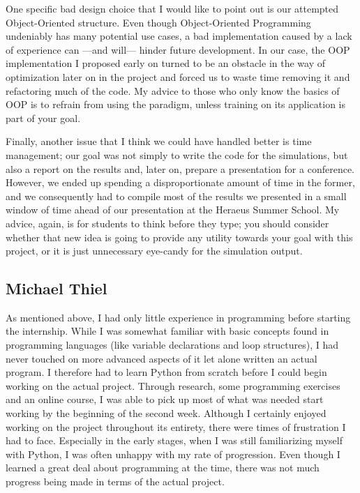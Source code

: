 \documentclass[11pt,twocolumn]{article}
\begin{document}
\begin{appendix}
\begin{strip}
One specific bad design choice that I would like to point out is our attempted Object-Oriented structure. Even though Object-Oriented Programming undeniably has many potential use cases, a bad implementation caused by a lack of experience can ---and will--- hinder future development. In our case, the OOP implementation I proposed early on turned to be an obstacle in the way of optimization later on in the project and forced us to waste time removing it and refactoring much of the code. My advice to those who only know the basics of OOP is to refrain from using the paradigm, unless training on its application is part of your goal.

Finally, another issue that I think we could have handled better is time management; our goal was not simply to write the code for the simulations, but also a report on the results and, later on, prepare a presentation for a conference. However, we ended up spending a disproportionate amount of time in the former, and we consequently had to compile most of the results we presented in a small window of time ahead of our presentation at the Heraeus Summer School. My advice, again, is for students to think before they type; you should consider whether that new idea is going to provide any utility towards your goal with this project, or it is just unnecessary eye-candy for the simulation output.

\subsection{Michael Thiel} \label{Thiel}

As mentioned above, I had only little experience in programming before starting the internship. While I was somewhat familiar with basic concepts found in programming languages (like variable declarations and loop structures), I had never touched on more advanced aspects of it let alone written an actual program. I therefore had to learn Python from scratch before I could begin working on the actual project. Through research, some programming exercises and an online course,{\footnotemark} I was able to pick up most of what was needed start working by the beginning of the second week. 
Although I certainly enjoyed working on the project throughout its entirety, there were times of frustration I had to face. Especially in the early stages, when I was still familiarizing myself with Python, I was often unhappy with my rate of progression. Even though I learned a great deal about programming at the time, there was not much progress being made in terms of the actual project.


\end{strip}
\end{appendix}
\end{document}
